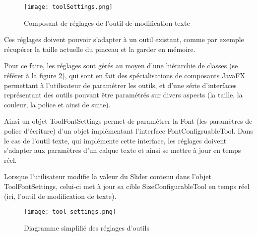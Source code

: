 \begin{figure}[H]
	\caption{Composant de réglages de l'outil de modification texte}
	\centering
	\texttt{[image: toolSettings.png]}
	\label{fig:text_settings}
\end{figure}

\par
Ces réglages doivent pouvoir s'adapter à un outil existant, comme par exemple récupérer la taille actuelle du pinceau et la garder en mémoire.

Pour ce faire, les réglages sont gérés au moyen d'une hiérarchie de classes (se référer à la figure \ref{fig:tool_settings}), qui sont en fait des spécialisations de composants JavaFX permettant à l'utilisateur de paramétrer les outils, et d'une série d'interfaces représentant des outils pouvant être paramétrés sur divers aspects (la taille, la couleur, la police et ainsi de suite).
\par
Ainsi un objet ToolFontSettings permet de paramétrer la Font (les paramètres de police d'écriture) d'un objet implémentant l'interface FontConfigruableTool. Dans le cas de l'outil texte, qui implémente cette interface, les réglages doivent s'adapter aux paramètres d'un calque texte et ainsi se mettre à jour en temps réel. 
\par 
Lorsque l'utilisateur modifie la valeur du Slider contenu dans l'objet ToolFontSettings, celui-ci met à jour sa cible SizeConfigurableTool en temps réel (ici, l'outil de modification de texte).

\begin{figure}[h]
	\caption{Diagramme simplifié des réglages d'outils}
	\centering
	\texttt{[image: tool\_settings.png]}
	\label{fig:tool_settings}
\end{figure}

